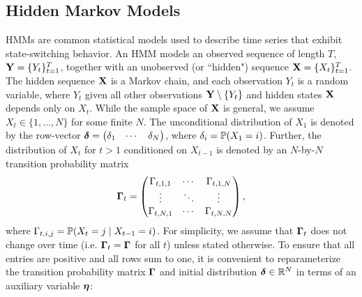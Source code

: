 \subsection{Hidden Markov Models}

HMMs are common statistical models used to describe time series that exhibit state-switching behavior. An HMM models an observed sequence of length $T$, $\mathbf{Y} = \{Y_t\}_{t=1}^T$, together with an unobserved (or  ``hidden") sequence $\mathbf{X} = \{X_t\}_{t=1}^T$. The hidden sequence $\mathbf{X}$ is a Markov chain, and each observation $Y_t$ is a random variable, where $Y_t$ given all other observations $\mathbf{Y} \setminus \{Y_t\}$ and hidden states $\mathbf{X}$ depends only on $X_t$. While the sample space of $\mathbf{X}$ is general, we assume $X_t \in \{1,\ldots,N\}$ for some finite $N$. The unconditional distribution of $X_1$ is denoted by the row-vector
%
$\boldsymbol{\delta} = \begin{pmatrix} \delta_{1} & \cdots & \delta_{N} \end{pmatrix}$,
%
where $\delta_{i} = \mathbb{P}(X_1 = i)$. Further, the distribution of $X_t$ for $t > 1$ conditioned on $X_{t-1}$ is denoted by an $N$-by-$N$ transition probability matrix
%
\begin{equation}
    \boldsymbol{\Gamma}_t = \begin{pmatrix} 
    \Gamma_{t,1,1} & \cdots & \Gamma_{t,1,N} \\
    \vdots & \ddots & \vdots \\
    \Gamma_{t,N,1} & \cdots & \Gamma_{t,N,N} \\
    \end{pmatrix},
\end{equation}
%
where $\Gamma_{t,i,j} = \mathbb{P}(X_t = j \mid X_{t-1} = i)$. %
For simplicity, we assume that $\boldsymbol{\Gamma}_t$ does not change over time (i.e. $\boldsymbol{\Gamma}_t = \boldsymbol{\Gamma}$ for all $t$) unless stated otherwise. 
%
%
To ensure that all entries are positive and all rows sum to one, it is convenient to reparameterize the transition probability matrix $\boldsymbol{\Gamma}$ and initial distribution $\boldsymbol{\delta} \in \mathbb{R}^N$ in terms of an auxiliary variable $\boldsymbol{\eta}$: %
